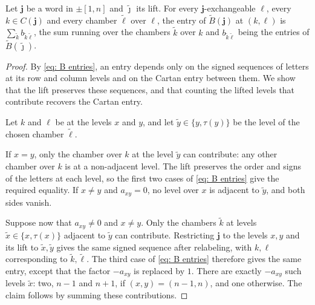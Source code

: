 \documentclass[a4paper]{amsart}
\numberwithin{equation}{section}
\theoremstyle{definition}
\theoremstyle{remark}
\newcommand{\bfj}{\mathbf{j}}
\newcommand{\tB}{\widetilde{B}}
\begin{document}
\begin{lemma}
  \label{lem: fold BFZ}
  Let $\bfj$ be a word in $\pm[1,n]$ and $\widetilde{\boldsymbol{\jmath}}$ its lift.
  For every $\bfj$-exchangeable $\ell$, every $k\in C(\bfj)$ and every chamber $\widetilde{\ell}$ over $\ell$, the entry of $\tB(\bfj)$ at $(k,\ell)$ is $\sum_{\widetilde{k}}b_{\widetilde{k}\widetilde{\ell}}$, the sum running over the chambers $\widetilde{k}$ over $k$ and $b_{\widetilde{k}\widetilde{\ell}}$ being the entries of $\tB(\widetilde{\boldsymbol{\jmath}})$.
\end{lemma}
\begin{proof}
  By \eqref{eq: B entries}, an entry depends only on the signed sequences of letters at its row and column levels and on the Cartan entry between them.
  We show that the lift preserves these sequences, and that counting the lifted levels that contribute recovers the Cartan entry.

  Let $k$ and $\ell$ be at the levels $x$ and $y$, and let $\widetilde{y}\in\{y,\tau(y)\}$ be the level of the chosen chamber $\widetilde{\ell}$.

  If $x=y$, only the chamber over $k$ at the level $\widetilde{y}$ can contribute: any other chamber over $k$ is at a non-adjacent level.
  The lift preserves the order and signs of the letters at each level, so the first two cases of \eqref{eq: B entries} give the required equality.
  If $x\neq y$ and $a_{xy}=0$, no level over $x$ is adjacent to $\widetilde{y}$, and both sides vanish.

  Suppose now that $a_{xy}\neq0$ and $x\neq y$.
  Only the chambers $\widetilde{k}$ at levels $\widetilde{x}\in\{x,\tau(x)\}$ adjacent to $\widetilde{y}$ can contribute.
  Restricting $\bfj$ to the levels $x,y$ and its lift to $\widetilde{x},\widetilde{y}$ gives the same signed sequence after relabeling, with $k,\ell$ corresponding to $\widetilde{k},\widetilde{\ell}$.
  The third case of \eqref{eq: B entries} therefore gives the same entry, except that the factor $-a_{xy}$ is replaced by $1$.
  There are exactly $-a_{xy}$ such levels $\widetilde{x}$: two, $n-1$ and $n+1$, if $(x,y)=(n-1,n)$, and one otherwise.
  The claim follows by summing these contributions.
\end{proof}
\end{document}
